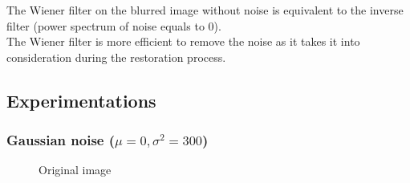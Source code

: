 \bigskip
The Wiener filter on the blurred image without noise is equivalent to the inverse filter (power spectrum of noise equals to 0). \\
The Wiener filter is more efficient to remove the noise as it takes it into consideration
during the restoration process.

\pagebreak
\subsection{Experimentations}

\subsubsection{Gaussian noise ($\mu = 0, \sigma^2 = 300$)}

\begin{figure}[!htb]\centering
    \begin{minipage}{0.45\textwidth}
        \caption{\small{Original image}}
    \end{minipage}
    \begin{minipage}{0.45\textwidth}

\end{minipage}
\end{figure}

